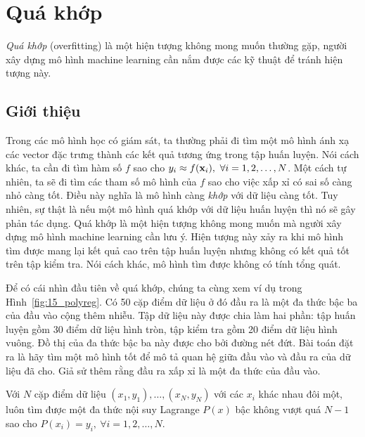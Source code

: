 \chapter{Quá khớp}
\label{cha:overfitting}


\textit{Quá khớp} (overfitting) là một hiện tượng không mong muốn thường gặp, người xây dựng mô hình
machine learning cần nắm được các kỹ thuật để tránh hiện tượng này.

\section{Giới thiệu}

Trong các mô hình học có giám sát, ta thường
phải đi tìm một mô hình ánh xạ các vector đặc trưng thành các kết quả tương ứng
trong tập huấn luyện. Nói cách khác, ta cần đi tìm hàm số $f$ sao cho $y_i \approx f(\mathbf{x}_i),
~\forall i = 1, 2,
\dots, N$. Một cách tự nhiên, ta sẽ đi tìm các tham số mô hình của $f$ sao cho
việc xấp xỉ có sai số càng nhỏ càng tốt. Điều này nghĩa là mô hình càng
\textit{khớp} với dữ liệu càng tốt. Tuy nhiên, sự thật là nếu một mô hình {quá
khớp} với dữ liệu huấn luyện thì nó sẽ gây phản tác dụng. Quá khớp là một hiện tượng không mong muốn mà người xây dựng mô hình machine learning cần lưu ý.
Hiện tượng này xảy ra khi mô hình tìm được mang lại kết quả cao trên tập huấn
luyện nhưng không có kết quả tốt trên tập kiểm tra. Nói cách khác, mô hình tìm được không có tính tổng quát.

Để có cái nhìn đầu tiên về quá khớp, chúng ta cùng xem ví dụ trong
Hình~\ref{fig:15_polyreg}. Có 50 cặp điểm dữ liệu ở đó đầu ra là một đa thức bậc
ba của đầu vào cộng thêm nhiễu. Tập dữ liệu này được chia làm hai phần: tập huấn luyện gồm 30 điểm
dữ liệu hình tròn, tập kiểm tra gồm 20 điểm dữ liệu hình vuông. Đồ thị của đa thức bậc ba này được cho bởi đường nét đứt. Bài toán đặt ra là hãy tìm
một mô hình tốt để mô tả quan hệ giữa đầu vào và đầu ra của dữ liệu đã cho. Giả sử thêm rằng đầu ra xấp xỉ là một đa thức của đầu vào.


Với $N$ cặp điểm dữ liệu $(x_1, y_1), \dots, (x_N, y_N)$ với các $x_i$ khác nhau
đôi một, luôn tìm được một {đa thức nội suy Lagrange} $P(x)$ bậc không
vượt quá $N-1$ sao cho $P(x_i) = y_i, ~\forall i = 1, 2, \dots, N$.


